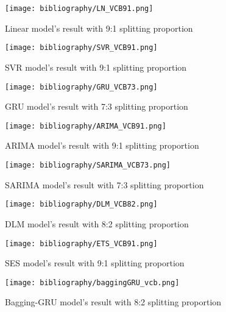 \documentclass{ieeeojies}
\begin{document}
\begin{figure}[H]
  \centering
  \begin{minipage}{0.8\linewidth}
    \centering
    \texttt{[image: bibliography/LN\_VCB91.png]}
    \caption{Linear model's result with 9:1 splitting proportion}
    \label{fig8}
  \end{minipage}
\end{figure}
\begin{figure}[H]
  \centering
  \begin{minipage}{0.8\linewidth}
    \centering
    \texttt{[image: bibliography/SVR\_VCB91.png]}
    \caption{SVR model's result with 9:1 splitting proportion}
    \label{fig9}
  \end{minipage}
\end{figure}
\begin{figure}[H]
  \centering
  \begin{minipage}{0.8\linewidth}
    \centering
    \texttt{[image: bibliography/GRU\_VCB73.png]}
    \caption{GRU model's result with 7:3 splitting proportion}
    \label{fig10}
  \end{minipage}
\end{figure}
\begin{figure}[H]
  \centering
  \begin{minipage}{0.8\linewidth}
    \centering
    \texttt{[image: bibliography/ARIMA\_VCB91.png]}
    \caption{ARIMA model's result with 9:1 splitting proportion}
    \label{fig11}
  \end{minipage}
\end{figure}
\begin{figure}[H]
  \centering
  \begin{minipage}{0.8\linewidth}
    \centering
    \texttt{[image: bibliography/SARIMA\_VCB73.png]}
    \caption{SARIMA model's result with 7:3 splitting proportion}
    \label{fig12}
  \end{minipage}
\end{figure}
\begin{figure}[H]
  \centering
  \begin{minipage}{0.8\linewidth}
    \centering
    \texttt{[image: bibliography/DLM\_VCB82.png]}
    \caption{DLM model's result with 8:2 splitting proportion}
    \label{fig13}
  \end{minipage}
\end{figure}
\begin{figure}[H]
  \centering
  \begin{minipage}{0.8\linewidth}
    \centering
    \texttt{[image: bibliography/ETS\_VCB91.png]}
    \caption{SES model's result with 9:1 splitting proportion}
    \label{fig14}
  \end{minipage}
\end{figure}
\begin{figure}[H]
  \centering
  \begin{minipage}{0.8\linewidth}
    \centering
    \texttt{[image: bibliography/baggingGRU\_vcb.png]}
    \caption{Bagging-GRU model's result with 8:2 splitting proportion}
    \label{bagginggru}
  \end{minipage}
\end{figure}
\end{document}
